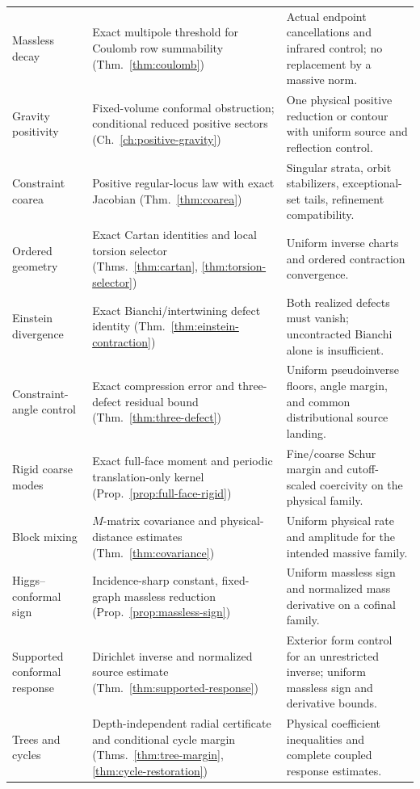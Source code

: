\documentclass[11pt,a4paper,oneside]{book}
\theoremstyle{plain}
\theoremstyle{definition}
\theoremstyle{remark}
\begin{document}
\begin{longtable}{@{}>{\raggedright\arraybackslash}p{}>{\raggedright\arraybackslash}p{}>{\raggedright\arraybackslash}p{}@{}}
Massless decay & Exact multipole threshold for Coulomb row summability (Thm.~\ref{thm:coulomb}) & Actual endpoint cancellations and infrared control; no replacement by a massive norm.\\[1pt]
Gravity positivity & Fixed-volume conformal obstruction; conditional reduced positive sectors (Ch.~\ref{ch:positive-gravity}) & One physical positive reduction or contour with uniform source and reflection control.\\[1pt]
Constraint coarea & Positive regular-locus law with exact Jacobian (Thm.~\ref{thm:coarea}) & Singular strata, orbit stabilizers, exceptional-set tails, refinement compatibility.\\[1pt]
Ordered geometry & Exact Cartan identities and local torsion selector (Thms.~\ref{thm:cartan}, \ref{thm:torsion-selector}) & Uniform inverse charts and ordered contraction convergence.\\[1pt]
Einstein divergence & Exact Bianchi/intertwining defect identity (Thm.~\ref{thm:einstein-contraction}) & Both realized defects must vanish; uncontracted Bianchi alone is insufficient.\\[1pt]
Constraint-angle control & Exact compression error and three-defect residual bound (Thm.~\ref{thm:three-defect}) & Uniform pseudoinverse floors, angle margin, and common distributional source landing.\\[1pt]
Rigid coarse modes & Exact full-face moment and periodic translation-only kernel (Prop.~\ref{prop:full-face-rigid}) & Fine/coarse Schur margin and cutoff-scaled coercivity on the physical family.\\[1pt]
Block mixing & $M$-matrix covariance and physical-distance estimates (Thm.~\ref{thm:covariance}) & Uniform physical rate and amplitude for the intended massive family.\\[1pt]
Higgs--conformal sign & Incidence-sharp constant, fixed-graph massless reduction (Prop.~\ref{prop:massless-sign}) & Uniform massless sign and normalized mass derivative on a cofinal family.\\[1pt]
Supported conformal response & Dirichlet inverse and normalized source estimate (Thm.~\ref{thm:supported-response}) & Exterior form control for an unrestricted inverse; uniform massless sign and derivative bounds.\\[1pt]
Trees and cycles & Depth-independent radial certificate and conditional cycle margin (Thms.~\ref{thm:tree-margin}, \ref{thm:cycle-restoration}) & Physical coefficient inequalities and complete coupled response estimates.\\[1pt]

\end{longtable}
\end{document}
